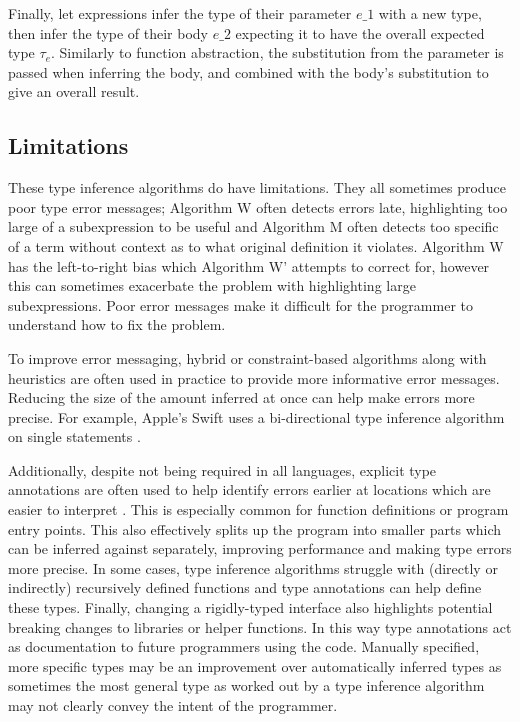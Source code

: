 \documentclass[a4paper,fleqn,oneside,12pt]{report}
\begin{document}
Finally, let expressions infer the type of their parameter $e\_1$ with a new type, then infer the type of their body $e\_2$ expecting it to have the overall expected type $\tau_e$. Similarly to function abstraction, the substitution from the parameter is passed when inferring the body, and combined with the body’s substitution to give an overall result.

\subsection{Limitations}

These type inference algorithms do have limitations. They all sometimes produce poor type error messages; Algorithm W often detects errors late, highlighting too large of a subexpression to be useful and Algorithm M often detects too specific of a term without context as to what original definition it violates. Algorithm W has the left-to-right bias which Algorithm W’ attempts to correct for, however this can sometimes exacerbate the problem with highlighting large subexpressions. Poor error messages make it difficult for the programmer to understand how to fix the problem.

To improve error messaging, hybrid or constraint-based algorithms along with heuristics are often used in practice to provide more informative error messages. Reducing the size of the amount inferred at once can help make errors more precise. For example, Apple’s Swift uses a bi-directional type inference algorithm on single statements \citep{ref34}.

Additionally, despite not being required in all languages, explicit type annotations are often used to help identify errors earlier at locations which are easier to interpret \citep{ref35}. This is especially common for function definitions or program entry points. This also effectively splits up the program into smaller parts which can be inferred against separately, improving performance and making type errors more precise. In some cases, type inference algorithms struggle with (directly or indirectly) recursively defined functions and type annotations can help define these types. Finally, changing a rigidly-typed interface also highlights potential breaking changes to libraries or helper functions. In this way type annotations act as documentation to future programmers using the code. Manually specified, more specific types may be an improvement over automatically inferred types as sometimes the most general type as worked out by a type inference algorithm may not clearly convey the intent of the programmer.
\end{document}
